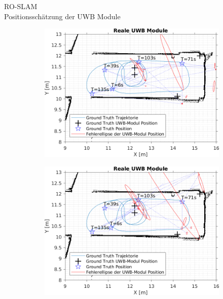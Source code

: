\documentclass{beamer}
\begin{document}
%
%
\begin{frame}{RO-SLAM\\\normalsize{Positionsschätzung der UWB Module}}

	\begin{figure}
		\centering
		\begin{subfigure}{0.41\linewidth}
			\centering
			\includegraphics[width=\linewidth]{Record_2018-02-08-12-33-53_filtered_3_beacon_error}
		\end{subfigure}
		\hfill
		\begin{subfigure}{0.41\linewidth}
			\centering
			\includegraphics[width=\linewidth]{Record_2018-02-08-12-33-53_filtered_1_beacon_error}

\end{subfigure}
\end{figure}
\end{frame}
\end{document}
